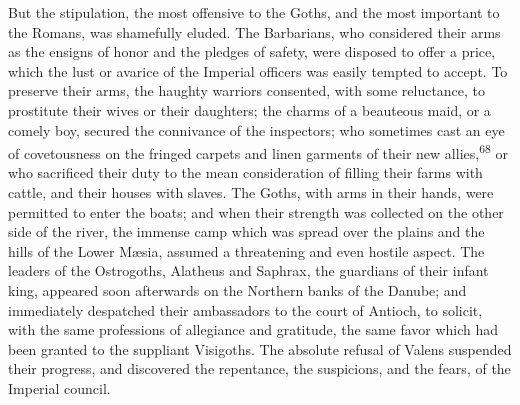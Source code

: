 But the stipulation, the most offensive to the Goths, and the
most important to the Romans, was shamefully eluded. The
Barbarians, who considered their arms as the ensigns of honor and
the pledges of safety, were disposed to offer a price, which the
lust or avarice of the Imperial officers was easily tempted to
accept. To preserve their arms, the haughty warriors consented,
with some reluctance, to prostitute their wives or their
daughters; the charms of a beauteous maid, or a comely boy,
secured the connivance of the inspectors; who sometimes cast an
eye of covetousness on the fringed carpets and linen garments of
their new allies,\textsuperscript{68} or who sacrificed their duty to the mean
consideration of filling their farms with cattle, and their
houses with slaves. The Goths, with arms in their hands, were
permitted to enter the boats; and when their strength was
collected on the other side of the river, the immense camp which
was spread over the plains and the hills of the Lower Mæsia,
assumed a threatening and even hostile aspect. The leaders of the
Ostrogoths, Alatheus and Saphrax, the guardians of their infant
king, appeared soon afterwards on the Northern banks of the
Danube; and immediately despatched their ambassadors to the court
of Antioch, to solicit, with the same professions of allegiance
and gratitude, the same favor which had been granted to the
suppliant Visigoths. The absolute refusal of Valens suspended
their progress, and discovered the repentance, the suspicions,
and the fears, of the Imperial council.




